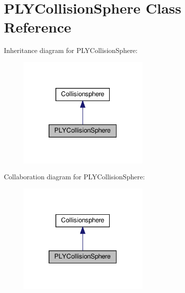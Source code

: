 \hypertarget{class_p_l_y_collision_sphere}{}\section{P\+L\+Y\+Collision\+Sphere Class Reference}
\label{class_p_l_y_collision_sphere}


Inheritance diagram for P\+L\+Y\+Collision\+Sphere\+:\nopagebreak
\begin{figure}[H]
\begin{center}
\leavevmode
\includegraphics[width=184pt]{class_p_l_y_collision_sphere__inherit__graph}
\end{center}
\end{figure}


Collaboration diagram for P\+L\+Y\+Collision\+Sphere\+:\nopagebreak
\begin{figure}[H]
\begin{center}
\leavevmode
\includegraphics[width=184pt]{class_p_l_y_collision_sphere__coll__graph}
\end{center}
\end{figure}
